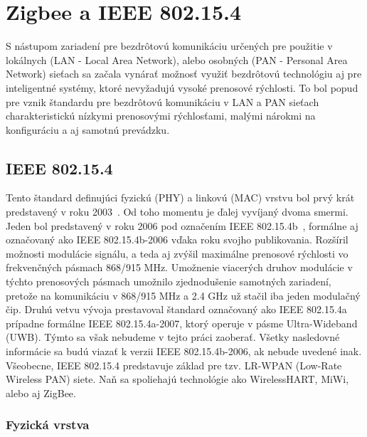 \chapter{Zigbee a IEEE 802.15.4}

\indent\indent S nástupom zariadení pre bezdrôtovú komunikáciu určených pre použitie v lokálnych (LAN - Local Area Network), alebo osobných (PAN - Personal Area Network) sieťach sa začala vynárať možnosť využiť bezdrôtovú technológiu aj pre inteligentné systémy, ktoré nevyžadujú vysoké prenosové rýchlosti. To bol popud pre vznik štandardu pre bezdrôtovú komunikáciu v LAN a PAN sieťach charakteristickú nízkymi prenosovými rýchlosťami, malými nárokmi na konfiguráciu a aj samotnú prevádzku.

\section{IEEE 802.15.4}

\indent\indent Tento štandard definujúci fyzickú (PHY) a linkovú (MAC) vrstvu bol prvý krát predstavený v roku 2003~\cite{ieee03}. Od toho momentu je ďalej vyvíjaný dvoma smermi. Jeden bol predstavený v roku 2006 pod označením IEEE 802.15.4b~\cite{ieee06}, formálne aj označovaný ako IEEE 802.15.4b-2006 vďaka roku svojho publikovania. Rozšíril možnosti modulácie signálu, a teda aj zvýšil maximálne prenosové rýchlosti vo frekvenčných pásmach 868/915 MHz. Umožnenie viacerých druhov modulácie v týchto prenosových pásmach umožnilo zjednodušenie samotných zariadení, pretože na komunikáciu v 868/915 MHz a 2.4 GHz už stačil iba jeden modulačný čip. Druhú vetvu vývoja prestavoval štandard označovaný ako IEEE 802.15.4a prípadne formálne IEEE 802.15.4a-2007, ktorý operuje v pásme Ultra-Wideband (UWB). Týmto sa však nebudeme v tejto práci zaoberať. Všetky nasledovné informácie sa budú viazať k verzii IEEE 802.15.4b-2006, ak nebude uvedené inak.\\
\indent Všeobecne, IEEE 802.15.4 predstavuje základ pre tzv. LR-WPAN (Low-Rate Wireless PAN) siete. Naň sa spoliehajú technológie ako WirelessHART, MiWi, alebo aj ZigBee.

\subsection{Fyzická vrstva}


